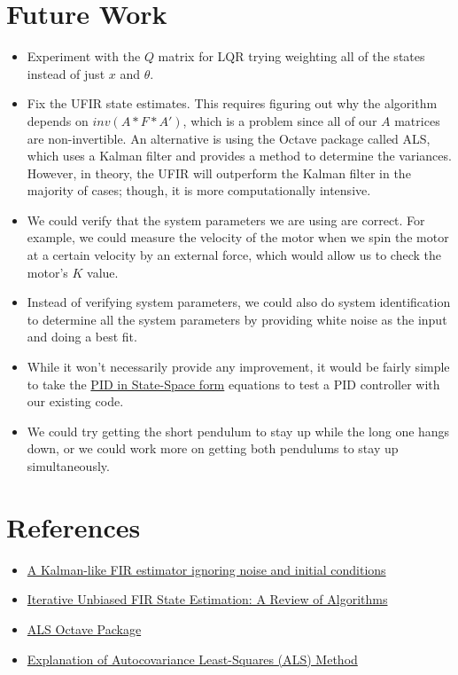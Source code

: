 \documentclass{article}
\begin{document}
\section{Future Work}
\begin{itemize}
\item Experiment with the $Q$ matrix for LQR trying weighting all of the states instead of just $x$ and $\theta$.
\item Fix the UFIR state estimates. This requires figuring out why the algorithm depends on $inv(A*F*A')$, which is a problem since all of our $A$ matrices are non-invertible. An alternative is using the Octave package called ALS, which uses a Kalman filter and provides a method to determine the variances. However, in theory, the UFIR will outperform the Kalman filter in the majority of cases; though, it is more computationally intensive.
\item We could verify that the system parameters we are using are correct. For example, we could measure the velocity of the motor when we spin the motor at a certain velocity by an external force, which would allow us to check the motor's $K$ value.
\item Instead of verifying system parameters, we could also do system identification to determine all the system parameters by providing white noise as the input and doing a best fit.
\item While it won't necessarily provide any improvement, it would be fairly simple to take the \href{https://github.com/floft/PIDinStateSpace}{PID in State-Space form} equations to test a PID controller with our existing code.
\item We could try getting the short pendulum to stay up while the long one hangs down, or we could work more on getting both pendulums to stay up simultaneously.
\end{itemize}

\section{References}
\begin{itemize}
\item \href{https://www.researchgate.net/publication/233854533_A_Kalman-like_FIR_estimator_ignoring_noise_and_initial_conditions}{A Kalman-like FIR estimator ignoring noise and initial conditions}
\item \href{http://engagedscholarship.csuohio.edu/cgi/viewcontent.cgi?article=1214&context=enece_facpub}{Iterative Unbiased FIR State Estimation: A Review of Algorithms}
\item \href{http://jbrwww.che.wisc.edu/software/als/index.html}{ALS Octave Package}
\item \href{http://jbrwww.che.wisc.edu/tech-reports/twmcc-2007-02.pdf}{Explanation of Autocovariance Least-Squares (ALS) Method}
\end{itemize}
\end{document}

